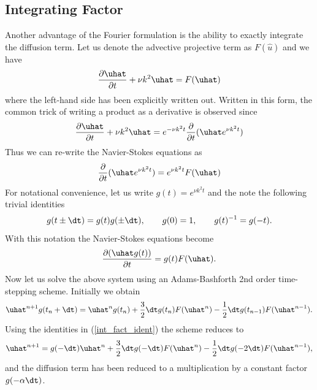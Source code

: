 \subsection{Integrating Factor}
Another advantage of the Fourier formulation is the ability to exactly integrate the diffusion term. Let us denote the advective projective term as $F(\hat{u})$ and we have
\begin{align}
\frac{\partial \uhat}{\partial t} + \nu k^{2}\uhat = F(\uhat) 
\end{align}
where the left-hand side has been explicitly written out. Written in this form, the common trick of writing a product as a derivative is observed since
\begin{align}
 \frac{\partial \uhat}{\partial t} + \nu k^{2}\uhat= e^{-\nu k^{2}t}\frac{\partial }{\partial t}(\uhat e^{\nu k^{2}t})
\end{align}
Thus we can re-write the Navier-Stokes equations as 
\begin{align}
\frac{\partial }{\partial t}(\uhat e^{\nu k^{2}t})= e^{\nu k^{2}t}F(\uhat) 
\end{align}
For notational convenience, let us write $g(t) = e^{\nu k^{2}t}$ and the note the following trivial identities
\begin{align}
g(t\pm\dt) = g(t)g(\pm\dt),\qquad g(0) = 1, \qquad g(t)^{-1} = g(-t).\label{int_fact_ident}
\end{align}
With this notation the Navier-Stokes equations become
\begin{align}
\frac{\partial (\uhat g(t))}{\partial t} = g(t)F(\uhat).
\end{align}
 Now let us solve the above system using an Adams-Bashforth 2nd order time-stepping scheme. Initially we obtain
\begin{align}
\uhat^{n+1}g(t_{n}+\dt) = \uhat^{n}g(t_{n}) + \frac{3}{2}\dt g(t_{n})F(\uhat^{n}) - \frac{1}{2}\dt g(t_{n-1})F(\uhat^{n-1}).
\end{align}
Using the identities in (\ref{int_fact_ident}) the scheme reduces to
\begin{align}
\uhat^{n+1} = g(-\dt)\uhat^{n} + \frac{3}{2}\dt g(-\dt)F(\uhat^{n}) - \frac{1}{2}\dt g(-2\dt)F(\uhat^{n-1}),
\end{align}
and the diffusion term has been reduced to a multiplication by a constant factor $g(-\alpha\dt)$.

